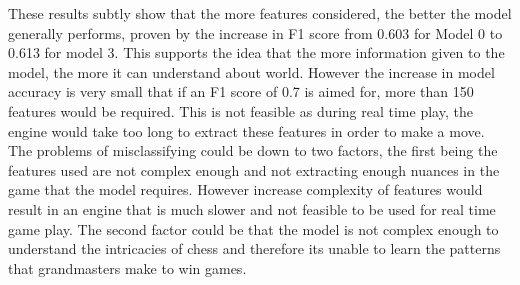 These results subtly show that the more features considered, the better the model generally performs, proven by the increase in F1 score from 0.603 for Model 0 to 0.613 for model 3. This supports the idea that the more information given to the model, the more it can understand about world. However the increase in model accuracy is very small that if an F1 score of 0.7 is aimed for, more than 150 features would be required. This is not feasible as during real time play, the engine would take too long to extract these features in order to make a move. The problems of misclassifying could be down to two factors, the first being the features used are not complex enough and not extracting enough nuances in the game that the model requires. However increase complexity of features would result in an engine that is much slower and not feasible to be used for real time game play. The second factor could be that the model is not complex enough to understand the intricacies of chess and therefore its unable to learn the patterns that grandmasters make to win games.





